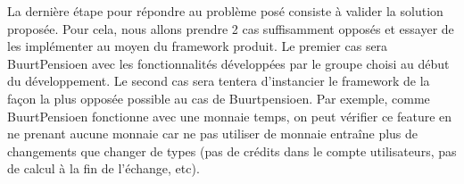 La dernière étape pour répondre au problème posé consiste à valider la solution proposée.  Pour cela,  nous allons prendre 2 cas suffisamment opposés et essayer de les implémenter au moyen du framework produit.  Le premier cas sera BuurtPensioen avec les fonctionnalités développées par le groupe choisi au début du développement.  Le second cas sera tentera d'instancier le framework de la façon la plus opposée possible au cas de Buurtpensioen.  Par exemple,  comme BuurtPensioen fonctionne avec une monnaie temps,  on peut vérifier ce feature en ne prenant aucune monnaie car ne pas utiliser de monnaie entraîne plus de changements que changer de types (pas de crédits dans le compte utilisateurs,  pas de calcul à la fin de l'échange,  etc).
